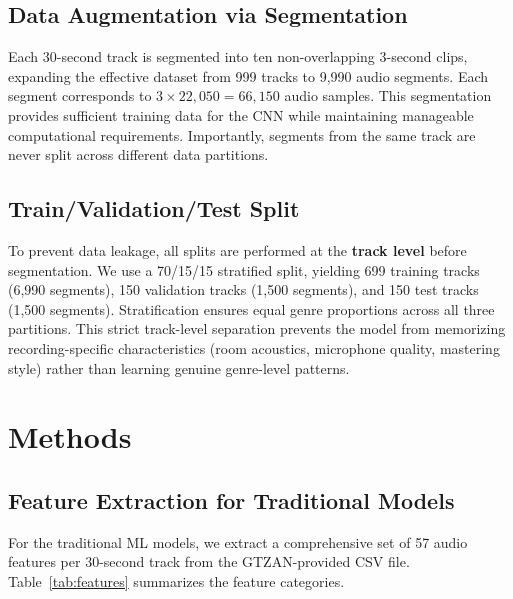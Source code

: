 \documentclass[10pt,journal]{IEEEtran}
\begin{document}
\subsection{Data Augmentation via Segmentation}
Each 30-second track is segmented into ten non-overlapping 3-second clips, expanding the effective dataset from 999 tracks to 9,990 audio segments. Each segment corresponds to $3 \times 22{,}050 = 66{,}150$ audio samples. This segmentation provides sufficient training data for the CNN while maintaining manageable computational requirements. Importantly, segments from the same track are never split across different data partitions.

\subsection{Train/Validation/Test Split}
To prevent data leakage, all splits are performed at the \textbf{track level} before segmentation. We use a 70/15/15 stratified split, yielding 699 training tracks (6,990 segments), 150 validation tracks (1,500 segments), and 150 test tracks (1,500 segments). Stratification ensures equal genre proportions across all three partitions. This strict track-level separation prevents the model from memorizing recording-specific characteristics (room acoustics, microphone quality, mastering style) rather than learning genuine genre-level patterns.

\section{Methods}

\subsection{Feature Extraction for Traditional Models}

For the traditional ML models, we extract a comprehensive set of 57 audio features per 30-second track from the GTZAN-provided CSV file. Table~\ref{tab:features} summarizes the feature categories.
\end{document}
